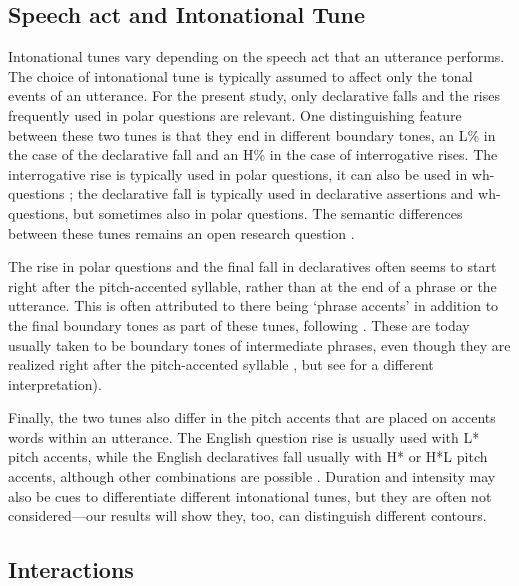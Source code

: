 \documentclass[preprint,review,12pt,authoryear,times]{elsarticle}
\begin{document}
\subsection{Speech act and Intonational Tune}

Intonational tunes vary depending on the speech act that an utterance performs. The choice of intonational tune is typically assumed to affect only the tonal events of an utterance. For the present study, only declarative falls and the rises frequently used in polar questions are relevant. One distinguishing feature between these two tunes is that they end in different boundary tones, an L\% in the case of the declarative fall and an H\% in the case of interrogative rises. The interrogative rise is typically used in polar questions, it can also be used in wh-questions \citep{hedbe14}; the declarative fall is typically used in declarative assertions and wh-questions, but sometimes also in polar questions. The semantic differences between these tunes remains an open research question \citep[see][for a review]{truck12}. 

The rise in polar questions and the final fall in declaratives often seems to start right after the pitch-accented syllable, rather than at the end of a phrase or the utterance. This is often attributed to there being `phrase accents' in addition to the final boundary tones as part of these tunes, following \citep{pierr80}. These are today usually taken to be boundary tones of intermediate phrases, even though they are realized right after the pitch-accented syllable \citep[see][for a review and empirical evidence in favor of phrase accents]{grice00}, but see \citealt{barne10} for a different interpretation). 

Finally, the two tunes also differ in the pitch accents that are placed on accents words within an utterance. The English question rise is usually used with L* pitch accents, while the English declaratives fall usually with H* or H*L pitch accents, although other combinations are possible \citep{pierr90}. Duration and intensity may also be cues to differentiate different intonational tunes, but they are often not considered---our results will show they, too, can distinguish different contours. 


\subsection{Interactions}
\end{document}
